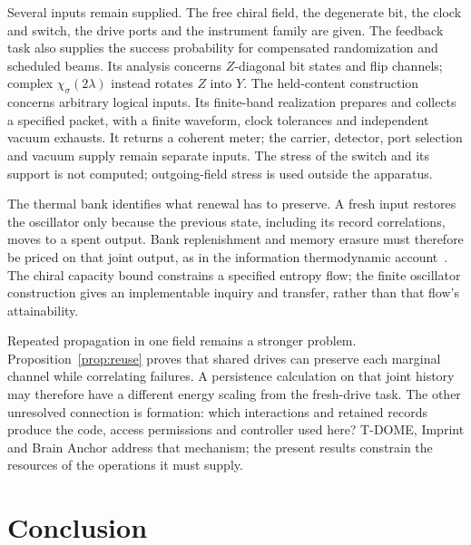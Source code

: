 \documentclass[aps,pre,onecolumn,superscriptaddress,floatfix,longbibliography]{revtex4-2}
\begin{document}
Several inputs remain supplied. The free chiral field, the degenerate bit, the
clock and switch, the drive ports and the instrument family are given. The
feedback task also supplies the success probability for compensated randomization
and scheduled beams. Its analysis concerns $Z$-diagonal bit states and flip
channels; complex $\chi_\sigma(2\lambda)$ instead rotates $Z$ into $Y$.
The held-content construction concerns arbitrary logical inputs. Its finite-band
realization prepares and collects a specified packet, with a finite waveform,
clock tolerances and independent vacuum exhausts. It returns a coherent meter;
the carrier, detector, port selection and vacuum supply remain separate inputs.
The stress of the switch
and its support is not computed; outgoing-field stress is used outside the apparatus.

The thermal bank identifies what renewal has to preserve. A fresh input
restores the oscillator only because the previous state, including its
record correlations, moves to a spent output. Bank replenishment and memory
erasure must therefore be priced on that joint output, as in the information
thermodynamic account~\cite{Sagawa2012,Parrondo2015}. The chiral capacity bound
constrains a specified entropy flow; the finite oscillator construction gives
an implementable inquiry and transfer, rather than that flow's attainability.

Repeated propagation in one field remains a stronger problem.
Proposition~\ref{prop:reuse} proves that shared drives can preserve each
marginal channel while correlating failures. A persistence calculation on
that joint history may therefore have a different energy scaling from the
fresh-drive task. The other unresolved connection is formation: which
interactions and retained records produce the code, access permissions and
controller used here? T-DOME, Imprint and Brain Anchor address that mechanism;
the present results constrain the resources of the operations it must supply.

\section{Conclusion}
\end{document}

